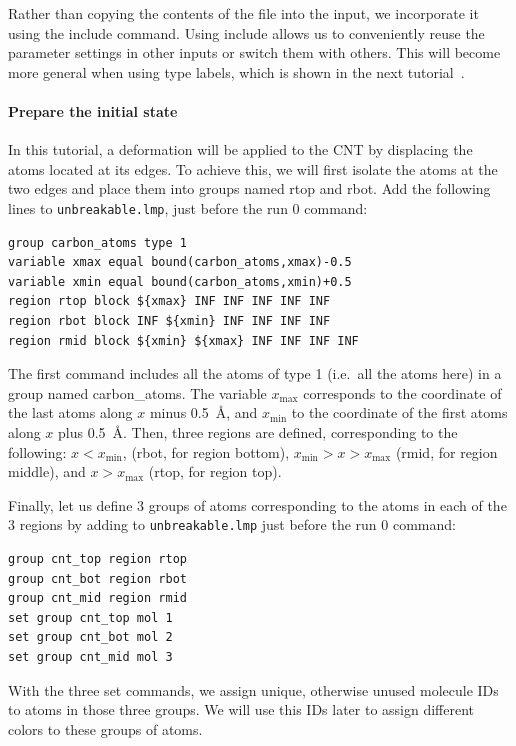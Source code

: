 \documentclass[9pt,tutorial]{livecoms}
\newcommand{\lmpcmd}[1]{\hspace{0pt}\colorbox{listing}{\textcolor{command}{\small{#1}}}\hspace{0pt}} %
\newcommand{\flecmd}[1]{\textcolor{command}{\texttt{#1}}} %
\begin{document}
\begin{note}
Rather than copying the contents of the file into the input, we
incorporate it using the \lmpcmd{include} command.  Using \lmpcmd{include} allows
us to conveniently reuse the parameter settings
in other inputs or switch them with others.  This will become more general
when using type labels, which is shown in the next
tutorial~\cite{gissinger2024type}.
\end{note}

\paragraph{Prepare the initial state}

In this tutorial, a deformation will be applied to the CNT by displacing
the atoms located at its edges.  To achieve this, we will first isolate the
atoms at the two edges and place them into groups named \lmpcmd{rtop} and
\lmpcmd{rbot}.  Add the following lines to \flecmd{unbreakable.lmp},
just before the \lmpcmd{run 0} command:
\begin{lstlisting}
group carbon_atoms type 1
variable xmax equal bound(carbon_atoms,xmax)-0.5
variable xmin equal bound(carbon_atoms,xmin)+0.5
region rtop block ${xmax} INF INF INF INF INF
region rbot block INF ${xmin} INF INF INF INF
region rmid block ${xmin} ${xmax} INF INF INF INF
\end{lstlisting}
The first command includes all the atoms of type 1 (i.e.~all the atoms here)
in a group named \lmpcmd{carbon\_atoms}.
The variable $x_\text{max}$ corresponds to the coordinate of the
last atoms along $x$ minus 0.5~Å, and $x_\text{min}$ to the coordinate
of the first atoms along $x$ plus 0.5~Å.  Then, three regions are defined,
corresponding to the following: $x < x_\text{min}$, (\lmpcmd{rbot}, for region
bottom), $x_\text{min} > x > x_\text{max}$ (\lmpcmd{rmid}, for region middle),
and $x > x_\text{max}$ (\lmpcmd{rtop}, for region top).

Finally, let us define 3 groups of atoms corresponding to the atoms
in each of the 3 regions by adding to \flecmd{unbreakable.lmp}
just before the \lmpcmd{run 0} command:
\begin{lstlisting}
group cnt_top region rtop
group cnt_bot region rbot
group cnt_mid region rmid
set group cnt_top mol 1
set group cnt_bot mol 2
set group cnt_mid mol 3
\end{lstlisting}
With the three \lmpcmd{set} commands, we assign unique, otherwise unused
molecule IDs to atoms in those three groups.  We will use this IDs later to
assign different colors to these groups of atoms.
\end{document}
